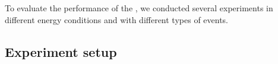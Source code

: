 To evaluate the performance of the \fullsys, we conducted several experiments in different energy conditions and with different types of events. 
\subsection{Experiment setup}
\label{sec:experiment_setup}

%

%
